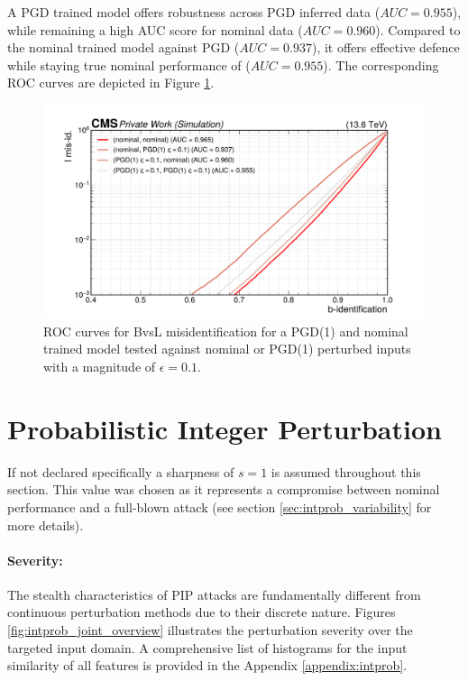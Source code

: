A PGD trained model offers robustness across PGD inferred data ($AUC=0.955$), while remaining a high AUC score for nominal data ($AUC=0.960$). Compared to the nominal trained model against PGD ($AUC=0.937$), it offers effective defence while staying true nominal performance of ($AUC=0.955$). The corresponding ROC curves are depicted in Figure \ref{fig:pgd_trained}. 

\begin{figure}[h]
\centering
    \includegraphics[width=15cm]{media/output/roc_bvsl_pgd_perms.pdf}
    \caption{ROC curves for BvsL misidentification for a PGD(1) and nominal trained model tested against nominal or PGD(1) perturbed inputs with a magnitude of $\epsilon=0.1$.}
    \label{fig:pgd_trained}
\end{figure}

\FloatBarrier
\section{Probabilistic Integer Perturbation}
\label{sec:inprob_result}

If not declared specifically a sharpness of $s=1$ is assumed throughout this section. This value was chosen as it represents a compromise between nominal performance and a full-blown attack (see section \ref{sec:intprob_variability} for more details).

\paragraph{Severity:} The stealth characteristics of PIP attacks are fundamentally different from continuous perturbation methods due to their discrete nature. Figures \ref{fig:intprob_joint_overview} illustrates the perturbation severity over the targeted input domain. A comprehensive list of histograms for the input similarity of all features is provided in the Appendix \ref{appendix:intprob}.

